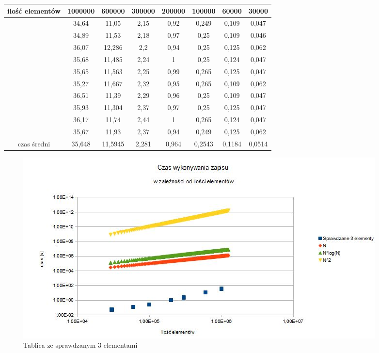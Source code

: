 \documentclass[12pt,a4paper,titlepage]{article}
\begin{document}
\begin{center}
\begin {tabular}{|c|c|c|c|c|c|c|c|}\hline
ilość elementów&1000000&600000&300000&200000&100000&60000&30000\\\hline
&34,64&11,05&2,15&0,92&0,249&0,109&0,047\\\hline
&34,89&11,53&2,18&0,97&0,25&0,109&0,046\\\hline
&36,07&12,286&2,2&0,94&0,25&0,125&0,062\\\hline
&35,68&11,485&2,24&1&0,25&0,124&0,047\\\hline
&35,65&11,563&2,25&0,99&0,265&0,125&0,047\\\hline
&35,27&11,667&2,32&0,95&0,265&0,109&0,062\\\hline
&36,51&11,39&2,29&0,96&0,25&0,109&0,047\\\hline
&35,93&11,304&2,37&0,97&0,25&0,125&0,047\\\hline
&36,17&11,74&2,44&1&0,265&0,124&0,047\\\hline
&35,67&11,93&2,37&0,94&0,249&0,125&0,062\\\hline
czas średni&35,648&11,5945&2,281&0,964&0,2543&0,1184&0,0514\\\hline
\end{tabular}
\end {center}


\begin{figure}[h]
\begin{center}
\includegraphics[scale=0.7]{3_elementy.jpg}
\caption{Tablica ze sprawdzanym 3 elementami}
\end{center}
\end{figure}
\end{document}
